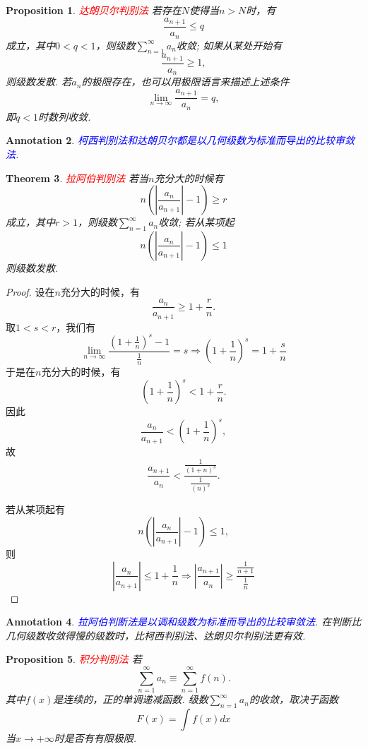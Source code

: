 \documentclass{article}
\newtheorem{theorem}{Theorem}[section]
\newtheorem{proposition}[theorem]{Proposition}
\newtheorem{annotation}[theorem]{Annotation}
\newcommand{\redt}[1]{\textcolor{red}{#1}}
\newcommand{\bluet}[1]{\textcolor{blue}{#1}}
\begin{document}
\begin{proposition}
\rm \redt{达朗贝尔判别法} 若存在$N$使得当$n > N$时，有
$$
\frac{a_{n+1}}{a_n} \leq q
$$
成立，其中$0 < q <1$，则级数$\sum\limits_{n=1}^\infty a_n$收敛; 如果从某处开始有
$$
\frac{a_{n+1}}{a_n} \geq 1,
$$
则级数发散. 若$a_n$的极限存在，也可以用极限语言来描述上述条件
$$
\lim\limits_{n \to \infty} \frac{a_{n+1}}{a_n} = q,
$$
即$q < 1$时数列收敛. 
\end{proposition}

\begin{annotation}
\rm \bluet{柯西判别法和达朗贝尔都是以几何级数为标准而导出的比较审敛法}. 
\end{annotation}

\begin{theorem}
\rm \redt{拉阿伯判别法} 若当$n$充分大的时候有
$$
n\left( \left| \frac{a_n}{a_{n+1}} \right| - 1\right) \geq r
$$
成立，其中$r > 1$，则级数$\sum\limits_{n=1}^\infty a_n$收敛; 若从某项起
$$
n\left( \left| \frac{a_n}{a_{n+1}} \right| - 1\right) \leq 1
$$
则级数发散. 
\end{theorem}

\begin{proof}
设在$n$充分大的时候，有
$$
\frac{a_n}{a_{n+1}} \geq  1 + \frac{r}{n}.
$$
取$1< s < r$，我们有
$$
\lim\limits_{n \to \infty} \frac{(1+\frac{1}{n})^s-1}{\frac{1}{n}} = s \Rightarrow  (1+\frac{1}{n})^s = 1 + \frac{s}{n}
$$
于是在$n$充分大的时候，有
$$
(1+\frac{1}{n})^s < 1+\frac{r}{n}. 
$$
因此
$$
\frac{a_n}{a_{n+1}} < (1+\frac{1}{n})^s,
$$
故
$$
\frac{a_{n+1}}{a_n} < \frac{\frac{1}{(1+n)^s}}{\frac{1}{(n)^s}}.
$$

若从某项起有
$$
n\left( \left| \frac{a_n}{a_{n+1}} \right| - 1\right) \leq 1,
$$
则
$$
\left| \frac{a_n}{a_{n+1}} \right| \leq 1 + \frac{1}{n} \Rightarrow \left| \frac{a_{n+1}}{a_{n}}\right| \geq \frac{\frac{1}{n+1}}{\frac{1}{n}}
$$
\end{proof}

\begin{annotation}
\rm \bluet{拉阿伯判断法是以调和级数为标准而导出的比较审敛法}. 在判断比几何级数收敛得慢的级数时，比柯西判别法、达朗贝尔判别法更有效. 
\end{annotation}

\begin{proposition}
\rm \redt{积分判别法} 若
$$
\sum\limits_{n=1}^\infty a_n \equiv \sum\limits_{n=1}^\infty f(n).
$$
其中$f(x)$是连续的，正的单调递减函数. 级数$\sum\limits_{n=1}^\infty a_n$的收敛，取决于函数
$$
F(x) = \int f(x)dx
$$
当$x \to +\infty$时是否有有限极限. 
\end{proposition}
\end{document}

